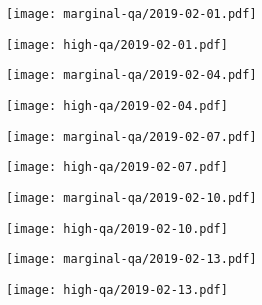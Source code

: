 \documentclass{article}
\begin{document}
\begin{figure}[H]
	\ContinuedFloat
	\centering
	\begin{subfigure}{0.48\linewidth}
		\texttt{[image: marginal-qa/2019-02-01.pdf]}
	\end{subfigure}
	\begin{subfigure}{0.48\linewidth}
		\texttt{[image: high-qa/2019-02-01.pdf]}
	\end{subfigure}
	\begin{subfigure}{0.48\linewidth}
		\texttt{[image: marginal-qa/2019-02-04.pdf]}
	\end{subfigure}
	\begin{subfigure}{0.48\linewidth}
		\texttt{[image: high-qa/2019-02-04.pdf]}
	\end{subfigure}
	\begin{subfigure}{0.48\linewidth}
		\texttt{[image: marginal-qa/2019-02-07.pdf]}
	\end{subfigure}
	\begin{subfigure}{0.48\linewidth}
		\texttt{[image: high-qa/2019-02-07.pdf]}
	\end{subfigure}
	\begin{subfigure}{0.48\linewidth}
		\texttt{[image: marginal-qa/2019-02-10.pdf]}
	\end{subfigure}
	\begin{subfigure}{0.48\linewidth}
		\texttt{[image: high-qa/2019-02-10.pdf]}
	\end{subfigure}
	\begin{subfigure}{0.48\linewidth}
		\texttt{[image: marginal-qa/2019-02-13.pdf]}
	\end{subfigure}
	\begin{subfigure}{0.48\linewidth}
		\texttt{[image: high-qa/2019-02-13.pdf]}
	\end{subfigure}
\end{figure}
\end{document}
